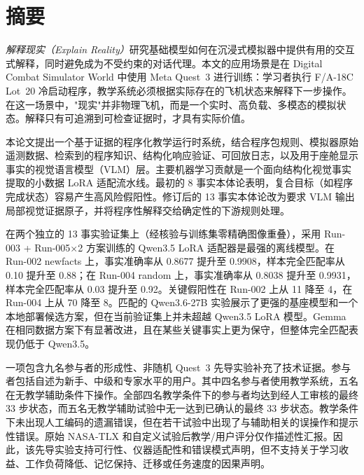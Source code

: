 %

\chapter*{摘要}

\emph{解释现实（Explain Reality）}研究基础模型如何在沉浸式模拟器中提供有用的交互式解释，同时避免成为不受约束的对话代理。本文的应用场景是在 Digital Combat Simulator World 中使用 Meta Quest~3 进行训练：学习者执行 F/A-18C Lot~20 冷启动程序，教学系统必须根据实际存在的飞机状态来解释下一步操作。在这一场景中，"现实"并非物理飞机，而是一个实时、高负载、多模态的模拟状态。解释只有可追溯到可检查证据时，才具有实际价值。

本论文提出一个基于证据的程序化教学运行时系统，结合程序包规则、模拟器原始遥测数据、检索到的程序知识、结构化响应验证、可回放日志，以及用于座舱显示事实的视觉语言模型（VLM）层。主要机器学习贡献是一个面向结构化视觉事实提取的小数据 LoRA 适配流水线。最初的 8 事实本体论表明，复合目标（如程序完成状态）容易产生高风险假阳性。修订后的 13 事实本体论改为要求 VLM 输出局部视觉证据原子，并将程序性解释交给确定性的下游规则处理。

在两个独立的 13 事实验证集上（经核验与训练集零精确图像重叠），采用 Run-003 + Run-005×2 方案训练的 Qwen3.5 LoRA 适配器是最强的离线模型。在 Run-002 newfacts 上，事实准确率从 0.8677 提升至 0.9908，样本完全匹配率从 0.10 提升至 0.88；在 Run-004 random 上，事实准确率从 0.8038 提升至 0.9931，样本完全匹配率从 0.03 提升至 0.92。关键假阳性在 Run-002 上从 11 降至 4，在 Run-004 上从 70 降至 8。匹配的 Qwen3.6-27B 实验展示了更强的基座模型和一个本地部署候选方案，但在当前验证集上并未超越 Qwen3.5 LoRA 模型。Gemma 在相同数据方案下有显著改进，且在某些关键事实上更为保守，但整体完全匹配表现仍低于 Qwen3.5。

一项包含九名参与者的形成性、非随机 Quest~3 先导实验补充了技术证据。参与者包括自述为新手、中级和专家水平的用户。其中四名参与者使用教学系统，五名在无教学辅助条件下操作。全部四名教学条件下的参与者均达到经人工审核的最终 33 步状态，而五名无教学辅助试验中无一达到已确认的最终 33 步状态。教学条件下未出现人工编码的遗漏错误，但在若干试验中出现了与辅助相关的误操作和提示性错误。原始 NASA-TLX 和自定义试验后教学/用户评分仅作描述性汇报。因此，该先导实验支持可行性、仪器适配性和错误模式声明，但不支持关于学习收益、工作负荷降低、记忆保持、迁移或任务速度的因果声明。

